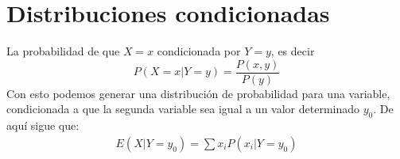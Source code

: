 \documentclass{./Probabilidad.tex}
\begin{document}
\section{Distribuciones condicionadas}
La probabilidad de que $X = x$ condicionada por $Y = y$, es decir  
\[
 P(X=x | Y=y) = \frac{P(x,y)}{P(y)} 
\]
Con esto podemos generar una distribución de probabilidad para una variable,
condicionada a que la segunda variable sea igual a un valor determinado $y_0$.
De aquí sigue que:
\begin{equation}
  \begin{split}
   E(X|Y=y_0) = \sum x_{i} P(x_{i}|Y=y_0)
  \end{split}
\end{equation}
\end{document}
